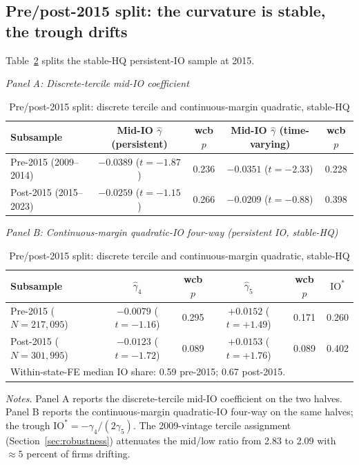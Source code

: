 \subsection{Pre/post-2015 split: the curvature is stable, the trough drifts}
\label{sec:prepost}

Table~\ref{tab:prepost} splits the stable-HQ persistent-IO sample at 2015.

\begin{table}[t]
\centering
\caption{Pre/post-2015 split: discrete tercile and continuous-margin quadratic, stable-HQ}
\label{tab:prepost}
\footnotesize
\begin{minipage}{\textwidth}
\centering
\textit{Panel A: Discrete-tercile mid-IO coefficient}\\[2pt]
\begin{tabular}{lcccc}
\toprule
Subsample & Mid-IO $\hat\gamma$ (persistent) & wcb $p$ & Mid-IO $\hat\gamma$ (time-varying) & wcb $p$ \\
\midrule
Pre-2015 (2009--2014)  & $-0.0389$ ($t=-1.87$) & 0.236 & $-0.0351$ ($t=-2.33$) & 0.228 \\
Post-2015 (2015--2023) & $-0.0259$ ($t=-1.15$) & 0.266 & $-0.0209$ ($t=-0.88$) & 0.398 \\
\bottomrule
\end{tabular}

\medskip
\textit{Panel B: Continuous-margin quadratic-IO four-way (persistent IO, stable-HQ)}\\[2pt]
\begin{tabular}{lccccc}
\toprule
Subsample & $\hat\gamma_{4}$ & wcb $p$ & $\hat\gamma_{5}$ & wcb $p$ & $\mathrm{IO}^{\ast}$ \\
\midrule
Pre-2015 ($N = 217{,}095$)   & $-0.0079$ ($t=-1.16$) & 0.295 & $+0.0152$ ($t=+1.49$) & 0.171 & 0.260 \\
Post-2015 ($N = 301{,}995$)  & $-0.0123$ ($t=-1.72$) & 0.089 & $+0.0153$ ($t=+1.76$) & 0.089 & 0.402 \\
\midrule
\multicolumn{6}{l}{Within-state-FE median IO share: 0.59 pre-2015; 0.67 post-2015.} \\
\bottomrule
\end{tabular}
\end{minipage}

\medskip
{\footnotesize\textit{Notes.} Panel A reports the discrete-tercile mid-IO coefficient on the two halves. Panel B reports the continuous-margin quadratic-IO four-way on the same halves; the trough $\mathrm{IO}^{\ast} = -\gamma_{4}/(2\gamma_{5})$. The 2009-vintage tercile assignment (Section~\ref{sec:robustness}) attenuates the mid/low ratio from 2.83 to 2.09 with $\approx 5$ percent of firms drifting.}
\end{table}

